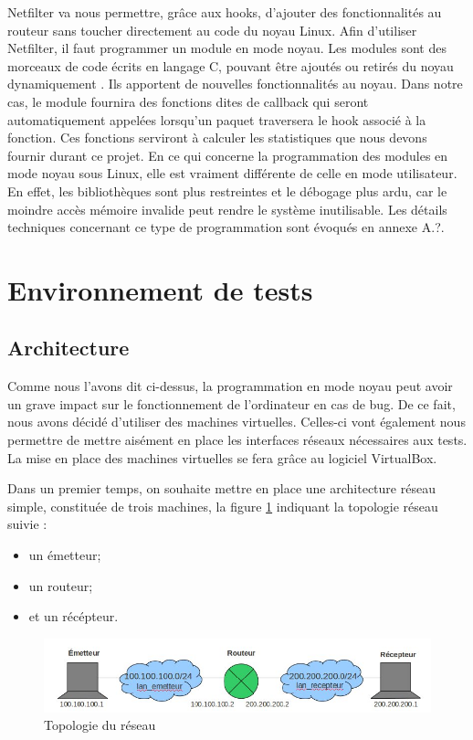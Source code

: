 \documentclass[a4paper]{article}
\begin{document}
Netfilter va nous permettre, grâce aux hooks, d'ajouter des fonctionnalités au routeur 
sans toucher directement au code du noyau Linux. Afin d'utiliser Netfilter, il faut 
programmer un module en mode noyau. Les modules sont des morceaux de code écrits en 
langage C, pouvant être ajoutés ou retirés du noyau dynamiquement \cite{module1}. Ils apportent de 
nouvelles fonctionnalités au noyau. Dans notre cas, le module fournira des fonctions 
dites de callback qui seront automatiquement appelées lorsqu'un paquet traversera le 
hook associé à la fonction. Ces fonctions serviront à calculer les statistiques que 
nous devons fournir durant ce projet.
En ce qui concerne la programmation des modules en mode noyau sous Linux, elle est 
vraiment différente de celle en mode utilisateur. En effet, les bibliothèques sont 
plus restreintes et le débogage plus ardu, car le moindre accès mémoire invalide peut 
rendre le système inutilisable. Les détails techniques concernant ce type de programmation 
sont évoqués en annexe A.?.

\section{Environnement de tests}

\subsection{Architecture}

Comme nous l'avons dit ci-dessus, la programmation en mode noyau peut avoir un grave 
impact sur le fonctionnement de l'ordinateur en cas de bug. De ce fait, nous avons 
décidé d'utiliser des machines virtuelles. Celles-ci vont également nous permettre 
de mettre aisément en place les interfaces réseaux nécessaires aux tests. La mise en 
place des machines virtuelles se fera grâce au logiciel VirtualBox\cite{virtbox}.

Dans un premier temps, on souhaite mettre en place une
architecture réseau simple, constituée de trois machines, la
figure \ref{topo} indiquant la topologie réseau suivie :
\begin{itemize}
	\item un émetteur;
	\item un routeur;
	\item et un récépteur.
\end{itemize}

\begin{figure}[!ht]
	\centering
	\includegraphics[scale=.5]{topo.jpg}
	\caption{\label{topo} Topologie du réseau}
\end{figure}
\end{document}
